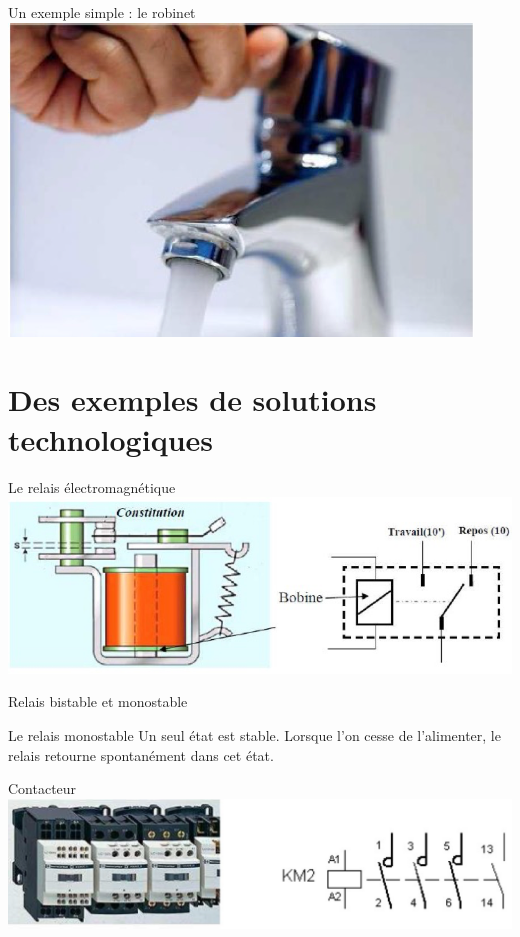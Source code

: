 \documentclass{beamer}
\begin{document}
    \begin{frame}{Un exemple simple : le robinet}
      \centering
      \includegraphics[width=.5\textwidth]{images/robinet}
    \end{frame}


\section{Des exemples de solutions technologiques}

\begin{frame}{Le relais électromagnétique}
  \centering
  \includegraphics[width=\textwidth]{images/relais_schema}
\end{frame}

\begin{frame}{Relais bistable et monostable}
  \begin{block}{Le relais monostable}
    Un seul état est stable. Lorsque l'on cesse de l'alimenter, le relais retourne spontanément dans cet état.
  \end{block}
\end{frame}

\begin{frame}{Contacteur}
  \includegraphics[width=\textwidth]{images/contacteur}
\end{frame}
\end{document}
